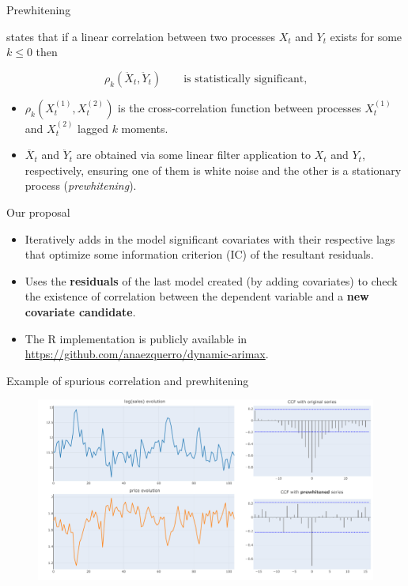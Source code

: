 \documentclass[10pt]{beamer}
\begin{document}
\begin{frame}{Prewhitening}

    \cite{cryer2008time} states that if a linear correlation between two processes $X_t$ and $Y_t$ exists for some $k\leq 0$ then
    
    \[ \rho_k(\ddot{X}_t, \ddot{Y}_t) \qquad \text{is statistically significant,} \] 

    \begin{itemize}
        \item $\rho_k(X_t^{(1)}, X_t^{(2)})$ is the cross-correlation function between processes $X_t^{(1)}$ and $X_t^{(2)}$ lagged $k$ moments.
        \item $\ddot{X_t}$ and $\ddot{Y}_t$ are obtained via some linear filter application to $X_t$ and $Y_t$, respectively, ensuring one of them is white noise and the other is a stationary process (\textit{prewhitening}).
    \end{itemize}

    \begin{block}{Our proposal}
        \vspace{0.2em}
        \begin{itemize}\small
            \item Iteratively adds in the model significant covariates with their respective lags that optimize some information criterion (IC) of the resultant residuals.
            \item Uses the \textbf{residuals} of the last model created (by adding covariates) to check the existence of correlation between the dependent variable and a \textbf{new covariate candidate}.
            \item The R implementation is publicly available in \url{https://github.com/anaezquerro/dynamic-arimax}.
        \end{itemize}
    \end{block}

\end{frame}

\begin{frame}{Example of spurious correlation and prewhitening}
    \begin{figure}
        \includegraphics[scale=0.35]{example prewhitening.pdf}
    \end{figure}
    
\end{frame}
\end{document}
